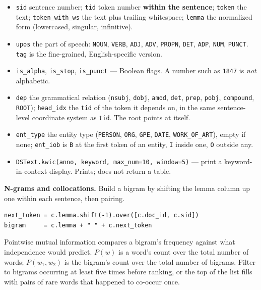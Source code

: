 \documentclass[11pt, a4paper]{article}
\newcommand{\code}[1]{\texttt{#1}}
\begin{document}
\begin{itemize}
  \item \code{sid} sentence number; \code{tid} token number \textbf{within the sentence};
        \code{token} the text; \code{token\_with\_ws} the text plus trailing whitespace;
        \code{lemma} the normalized form (lowercased, singular, infinitive).
  \item \code{upos} the part of speech: \code{NOUN}, \code{VERB}, \code{ADJ}, \code{ADV},
        \code{PROPN}, \code{DET}, \code{ADP}, \code{NUM}, \code{PUNCT}. \code{tag} is the
        fine-grained, English-specific version.
  \item \code{is\_alpha}, \code{is\_stop}, \code{is\_punct} --- Boolean flags. A number such as
        \code{1847} is \textit{not} alphabetic.
  \item \code{dep} the grammatical relation (\code{nsubj}, \code{dobj}, \code{amod},
        \code{det}, \code{prep}, \code{pobj}, \code{compound}, \code{ROOT});
        \code{head\_idx} the \code{tid} of the token it depends on, in the same
        sentence-level coordinate system as \code{tid}. The root points at itself.
  \item \code{ent\_type} the entity type (\code{PERSON}, \code{ORG}, \code{GPE},
        \code{DATE}, \code{WORK\_OF\_ART}), empty if none; \code{ent\_iob} is \code{B} at the
        first token of an entity, \code{I} inside one, \code{O} outside any.
  \item \code{DSText.kwic(anno, keyword, max\_num=10, window=5)} --- print a keyword-in-context
        display. Prints; does not return a table.
\end{itemize}

\smallskip

\textbf{N-grams and collocations.}
Build a bigram by shifting the lemma column up one within each sentence, then pairing.

\begin{verbatim}
next_token = c.lemma.shift(-1).over([c.doc_id, c.sid])
bigram     = c.lemma + " " + c.next_token
\end{verbatim}

Pointwise mutual information compares a bigram's frequency against what independence would
predict. $P(w)$ is a word's count over the total number of words; $P(w_1, w_2)$ is the
bigram's count over the total number of bigrams. Filter to bigrams occurring at least five
times before ranking, or the top of the list fills with pairs of rare words that happened to
co-occur once.
\end{document}
